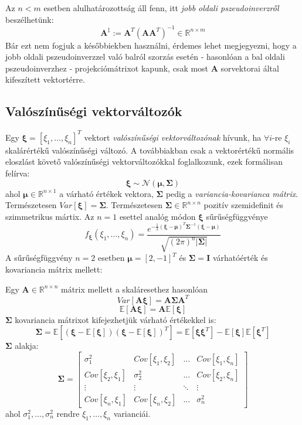 \documentclass[14p]{report}
\def\pmb{\boldsymbol}
\begin{document}
	Az $n < m$ esetben alulhatározottság áll fenn, itt \emph{jobb oldali pszeudoinverzről} beszélhetünk:
	\[
	\pmb{A}^{\ddagger} := \pmb{A}^T(\pmb{A}\pmb{A}^T)^{-1} \in \mathbb{R}^{n \times m}
	\]
	Bár ezt nem fogjuk a későbbiekben használni, érdemes lehet megjegyezni, hogy a jobb oldali pszeudoinverzzel való balról szorzás esetén - hasonlóan a bal oldali pszeudoinverzhez - projekciómátrixot kapunk, csak most $\pmb{A}$ sorvektorai által kifeszített vektortérre.
	\subsection{Valószínűségi vektorváltozók}
	Egy $\pmb{\xi} = [\xi_1, \dots , \xi_n]^T$ vektort \emph{valószínűségi vektorváltozónak} hívunk, ha $\forall i$-re $\xi_i$ skalárértékű valószínűségi változó. A továbbiakban csak a vektorértékű normális eloszlást követő valószínűségi vektorváltozókkal foglalkozunk, ezek formálisan felírva:
	\[
	\pmb{\xi} \sim \mathcal{N}(\pmb{\mu}, \pmb{\Sigma})
	\]
	ahol $\pmb{\mu} \in \mathbb{R}^{n \times 1}$ a várható értékek vektora, $\pmb{\Sigma}$ pedig a \emph{variancia-kovarianca mátrix}. Természetesen $Var[\pmb{\xi}] = \pmb{\Sigma}$. Természetesen $\pmb{\Sigma} \in \mathbb{R}^{n \times n}$ pozitív szemidefinit és szimmetrikus mártix. Az $n = 1$ esettel analóg módon $\pmb{\xi}$ sűrűségfüggvénye
	\[
	f_{\pmb{\xi}}(\xi_1, \dots, \xi_n) = \frac{ e^{-\frac{1}{2}(\pmb{\xi}-\pmb{\mu})^T\pmb{\Sigma}^{-1}(\pmb{\xi}-\pmb{\mu})}}{\sqrt{(2\pi)^n|\pmb{\Sigma}|}}
	\]
	A sűrűségfüggvény $n = 2$ esetben $\pmb{\mu} = [2, -1]^T$ és $\pmb{\Sigma} = \pmb{I}$ várhatóérték és kovariancia mátrix mellett: 
	\def\centerx{2}
	\def\centery{-1}
	
	\begin{center}
	\end{center} 
	Egy $\pmb{A} \in \mathbb{R}^{n \times n}$ mátrix mellett a skaláresethez hasonlóan 
	\[
	Var[\pmb{A}\pmb{\xi}] = \pmb{A} \pmb{\Sigma} \pmb{A}^T
	\]
	\[
	\mathbb{E}[\pmb{A}\pmb{\xi}] = \pmb{A}\mathbb{E}[\pmb{\xi}]
	\]
	$\pmb{\Sigma}$ kovariancia mátrixot kifejezhetjük várható értékekkel is:
	\[
	\pmb{\Sigma} = \mathbb{E}[(\pmb{\xi}-\mathbb{E}[\pmb{\xi}])(\pmb{\xi}-\mathbb{E}[\pmb{\xi}])^T] = \mathbb{E}[\pmb{\xi}\pmb{\xi}^T] - \mathbb{E}[\pmb{\xi}]\mathbb{E}[\pmb{\xi}^T]
	\]
	$\pmb{\Sigma}$ alakja:
	\[
	\pmb{\Sigma} = 
	\begin{bmatrix}
		\sigma_1^2 & Cov[\xi_1,\xi_2] & \dots & Cov[\xi_1,\xi_n] \\
		Cov[\xi_2,\xi_1] & \sigma_2^2 & \dots & Cov[\xi_2,\xi_n] \\
		\vdots & \vdots & \ddots & \vdots \\
		Cov[\xi_n,\xi_1] & Cov[\xi_n,\xi_2] & \dots & \sigma_n^2
	\end{bmatrix}
	\]
	ahol $\sigma_1^2, \dots, \sigma_n^2$ rendre $\xi_1, \dots, \xi_n$ varianciái.
\end{document}
